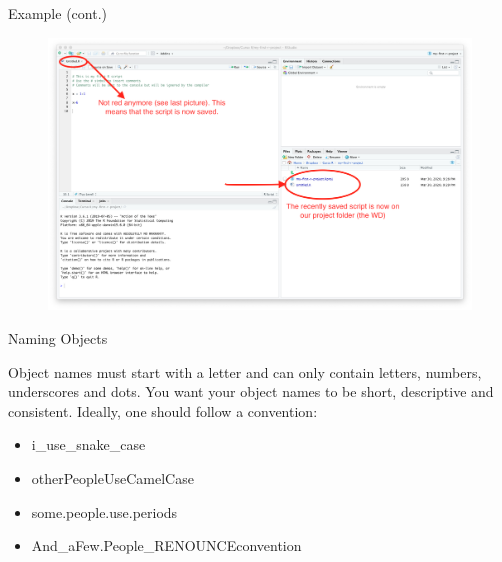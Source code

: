 \documentclass[ignorenonframetext,]{beamer}
\providecommand{\tightlist}{%
  \setlength{\itemsep}{0pt}\setlength{\parskip}{0pt}}
\begin{document}
\begin{frame}{Example (cont.)}
\protect\hypertarget{example-cont.}{}

\begin{figure}
\includegraphics[scale=0.17]{figures/saved-script.png}
\end{figure}

\end{frame}

\begin{frame}{Naming Objects}
\protect\hypertarget{naming-objects}{}

Object names must start with a letter and can only contain letters,
numbers, underscores and dots. You want your object names to be short,
descriptive and consistent. Ideally, one should follow a convention:

\begin{itemize}
\tightlist
\item
  i\_use\_snake\_case
\item
  otherPeopleUseCamelCase
\item
  some.people.use.periods
\item
  And\_aFew.People\_RENOUNCEconvention
\end{itemize}

\end{frame}
\end{document}
